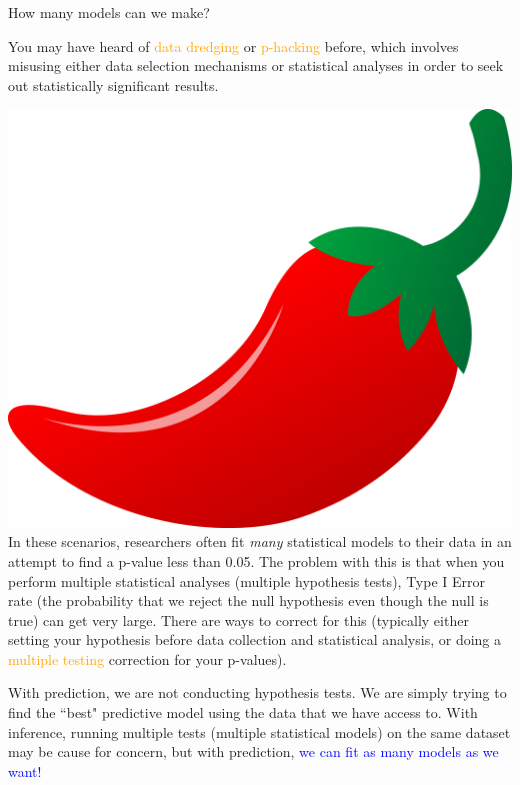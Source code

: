 \documentclass[10pt,t]{beamer}
\begin{document}
\begin{frame}{How many models can we make?}

You may have heard of \textcolor{orange}{data dredging} or \textcolor{orange}{p-hacking} before, which involves misusing either data selection mechanisms or statistical analyses in order to seek out statistically significant results.

\vspace{0.3cm}

\includegraphics[scale=0.01]{chilipepper.png} In these scenarios, researchers often fit \textit{many} statistical models to their data in an attempt to find a p-value less than 0.05. The problem with this is that when you perform multiple statistical analyses (multiple hypothesis tests), Type I Error rate (the probability that we reject the null hypothesis even though the null is true) can get very large. There are ways to correct for this (typically either setting your hypothesis before data collection and statistical analysis, or doing a \textcolor{orange}{multiple testing} correction for your p-values). 

\vspace{0.3cm}

With prediction, we are not conducting hypothesis tests. We are simply trying to find the ``best" predictive model using the data that we have access to. With inference, running multiple tests (multiple statistical models) on the same dataset may be cause for concern, but with prediction, \textcolor{blue}{we can fit as many models as we want!}

\end{frame}
\end{document}
